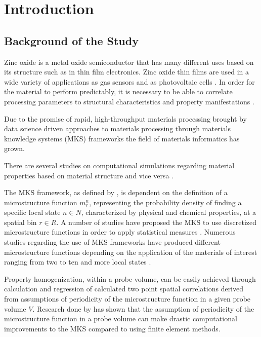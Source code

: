 \chapter{Introduction}
\section{Background of the Study}
Zinc oxide is a metal oxide semiconductor that has many different uses based on its structure such as in thin film electronics.
Zinc oxide thin films are used in a wide variety of applications as gas sensors \cite{florido17} and as photovoltaic cells \cite{fetsense}. In order for the material to perform predictably, it is necessary to be able to correlate processing parameters to structural characteristics and property manifestations \cite{florido17, fetsense}.

Due to the promise of rapid, high-throughput materials processing brought by data science driven approaches to materials processing through materials knowledge systems (MKS) frameworks \cite{gupta15, sun17, yabansu14} the field of materials informatics has grown.

There are several studies on computational simulations regarding material properties based on material structure and vice versa \cite{gupta15, yabansu14}.

The MKS framework, as defined by , is dependent on the definition of a microstructure function $m_r^n$, representing the probability density of finding a specific local state $n \in N$, characterized by physical and chemical properties, at a spatial bin $r \in R$. A number of studies have proposed the MKS to use discretized microstructure functions in order to apply statistical measures \cite{gupta15, sun17, yabansu14}. Numerous studies regarding the use of MKS frameworks have produced different microstructure functions depending on the application of the materials of interest ranging from two to ten and more local states \cite{gupta15, sun17, yabansu14}. 

Property homogenization, within a probe volume, can be easily achieved through calculation and regression of calculated two point spatial correlations derived from assumptions of periodicity of the microstructure function in a given probe volume $V$. Research done by  has shown that the assumption of periodicity of the microstructure function in a probe volume can make drastic computational improvements to the MKS compared to using finite element methods.


